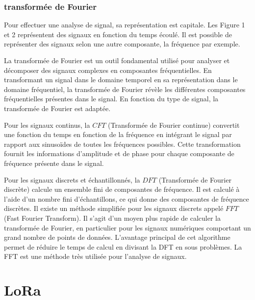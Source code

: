 \newpage

\subsubsection{transformée de Fourier}

Pour effectuer une analyse de signal, sa représentation est capitale. Les Figure 1 et 2 représentent des signaux en fonction du temps écoulé. Il est possible de représenter des signaux selon une autre composante, la fréquence par exemple.

\vspace{0.1cm}

La transformée de Fourier est un outil fondamental utilisé pour analyser et décomposer des signaux complexes en composantes fréquentielles. En transformant un signal dans le domaine temporel en sa représentation dans le domaine fréquentiel, la transformée de Fourier révèle les différentes composantes fréquentielles présentes dans le signal. En fonction du type de signal, la transformée de Fourier est adaptée.

\vspace{0.1cm}

Pour les signaux continus, la $CFT$ (Transformée de Fourier continue) convertit une fonction du temps en fonction de la fréquence en intégrant le signal par rapport aux sinusoïdes de toutes les fréquences possibles. Cette transformation fournit les informations d'amplitude et de phase pour chaque composante de fréquence présente dans le signal.

\vspace{0.1cm}

Pour les signaux discrets et échantillonnés, la $DFT$ (Transformée de Fourier discrète) calcule un ensemble fini de composantes de fréquence. Il est calculé à l’aide d’un nombre fini d’échantillons, ce qui donne des composantes de fréquence discrètes. Il existe un méthode simplifiée pour les signaux discrets appelé $FFT$ (Fast Fourier Transform). Il s'agit d'un moyen plus rapide de calculer la transformée de Fourier, en particulier pour les signaux numériques comportant un grand nombre de points de données. L'avantage principal de cet algorithme permet de réduire le temps de calcul en divisant la DFT en sous problèmes. La FFT est une méthode très utilisée pour l'analyse de signaux.

\newpage

\section{LoRa}


